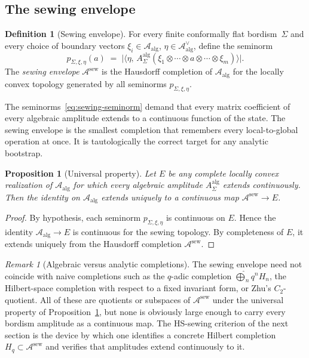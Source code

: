 \documentclass[11pt,reqno]{amsart}
\newtheorem{proposition}[theorem]{Proposition}
\theoremstyle{definition}
\newtheorem{definition}[theorem]{Definition}
\theoremstyle{remark}
\newtheorem{remark}[theorem]{Remark}
\newcommand{\cA}{\mathcal{A}}
\numberwithin{equation}{section}
\begin{document}
\subsection{The sewing envelope}

\begin{definition}[Sewing envelope]\label{def:sewing-envelope}
For every finite conformally flat bordism~$\Sigma$ and every
choice of boundary vectors
$\xi_i \in \cA_{\mathrm{alg}}$, $\eta \in \cA_{\mathrm{alg}}^\vee$,
define the seminorm
\begin{equation}\label{eq:sewing-seminorm}
p_{\Sigma,\xi,\eta}(a)
\;=\;
\bigl|\langle \eta,\,
A_\Sigma^{\mathrm{alg}}
(\xi_1 \otimes \cdots \otimes a \otimes \cdots \otimes \xi_m)
\rangle\bigr|.
\end{equation}
The \emph{sewing envelope} $\cA^{\mathrm{sew}}$ is the Hausdorff
completion of $\cA_{\mathrm{alg}}$ for the locally convex topology
generated by all seminorms $p_{\Sigma,\xi,\eta}$.
\end{definition}

The seminorms~\eqref{eq:sewing-seminorm} demand that every matrix
coefficient of every algebraic amplitude extends to a continuous
function of the state. The sewing envelope is the smallest
completion that remembers every local-to-global operation at once.
It is tautologically the correct target for any analytic bootstrap.

\begin{proposition}[Universal property]\label{prop:sewing-universal}
Let $E$ be any complete locally convex realization of
$\cA_{\mathrm{alg}}$ for which every algebraic amplitude
$A_\Sigma^{\mathrm{alg}}$ extends continuously. Then the identity
on $\cA_{\mathrm{alg}}$ extends uniquely to a continuous map
$\cA^{\mathrm{sew}} \to E$.
\end{proposition}

\begin{proof}
By hypothesis, each seminorm $p_{\Sigma,\xi,\eta}$ is continuous
on $E$. Hence the identity $\cA_{\mathrm{alg}} \to E$ is
continuous for the sewing topology. By completeness of $E$, it
extends uniquely from the Hausdorff completion
$\cA^{\mathrm{sew}}$.
\end{proof}

\begin{remark}[Algebraic versus analytic completions]
The sewing envelope need not coincide with naive completions
such as the $q$-adic completion
$\widehat{\bigoplus}_n q^n H_n$, the Hilbert-space completion
with respect to a fixed invariant form, or Zhu's $C_2$-quotient.
All of these are quotients or subspaces of $\cA^{\mathrm{sew}}$
under the universal property of
Proposition~\ref{prop:sewing-universal}, but none is obviously
large enough to carry every bordism amplitude as a continuous map.
The HS-sewing criterion of the next section is the device by
which one identifies a concrete Hilbert completion
$H_q \subset \cA^{\mathrm{sew}}$ and verifies that amplitudes
extend continuously to it.
\end{remark}
\end{document}
